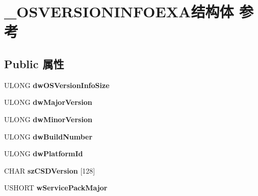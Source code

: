 \hypertarget{struct___o_s_v_e_r_s_i_o_n_i_n_f_o_e_x_a}{}\section{\+\_\+\+O\+S\+V\+E\+R\+S\+I\+O\+N\+I\+N\+F\+O\+E\+X\+A结构体 参考}
\label{struct___o_s_v_e_r_s_i_o_n_i_n_f_o_e_x_a}
\subsection*{Public 属性}
\begin{DoxyCompactItemize}
\item 
\mbox{\label{struct___o_s_v_e_r_s_i_o_n_i_n_f_o_e_x_a_a5c98d8a6a1c2fc203d3cbc972f9b3780}} 
U\+L\+O\+NG {\bfseries dw\+O\+S\+Version\+Info\+Size}
\item 
\mbox{\label{struct___o_s_v_e_r_s_i_o_n_i_n_f_o_e_x_a_a2fe0c98a56968db30b95dcd8c1f6f061}} 
U\+L\+O\+NG {\bfseries dw\+Major\+Version}
\item 
\mbox{\label{struct___o_s_v_e_r_s_i_o_n_i_n_f_o_e_x_a_a3af612c3f6515899059bba97c71a3b42}} 
U\+L\+O\+NG {\bfseries dw\+Minor\+Version}
\item 
\mbox{\label{struct___o_s_v_e_r_s_i_o_n_i_n_f_o_e_x_a_a76c1dc90b462535f708e749e6d335b31}} 
U\+L\+O\+NG {\bfseries dw\+Build\+Number}
\item 
\mbox{\label{struct___o_s_v_e_r_s_i_o_n_i_n_f_o_e_x_a_ae7d795b6c26d238ac541e1f79916aeb8}} 
U\+L\+O\+NG {\bfseries dw\+Platform\+Id}
\item 
\mbox{\label{struct___o_s_v_e_r_s_i_o_n_i_n_f_o_e_x_a_a8706724c81f020bb9e4c99b21e5ae7eb}} 
C\+H\+AR {\bfseries sz\+C\+S\+D\+Version} \mbox{[}128\mbox{]}
\item 
\mbox{\label{struct___o_s_v_e_r_s_i_o_n_i_n_f_o_e_x_a_a84b4ed2bbbf8d97bbaa0f4e0348878e7}} 
U\+S\+H\+O\+RT {\bfseries w\+Service\+Pack\+Major}

\end{DoxyCompactItemize}
